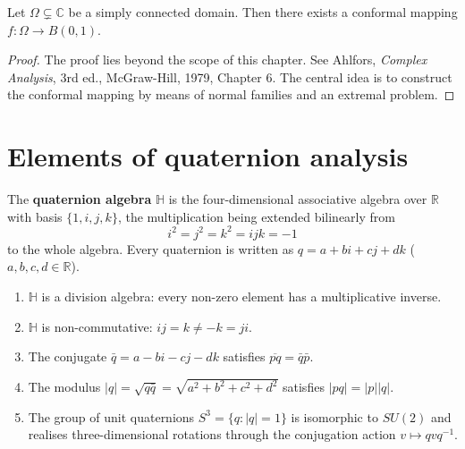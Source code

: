\begin{theorem}\label{thm:ca_riemann_mapping}
Let $\Omega \subsetneq \mathbb{C}$ be a simply connected domain. Then there exists a conformal mapping $f: \Omega \to B(0, 1)$.
\end{theorem}

\begin{proof}
The proof lies beyond the scope of this chapter. See Ahlfors, \textit{Complex Analysis}, 3rd ed., McGraw-Hill, 1979, Chapter 6. The central idea is to construct the conformal mapping by means of normal families and an extremal problem.
\end{proof}

\section{Elements of quaternion analysis}

\begin{definition}\label{def:ca_quaternion_algebra}
The \textbf{quaternion algebra} $\mathbb{H}$ is the four-dimensional associative algebra over $\mathbb{R}$ with basis $\{1, i, j, k\}$, the multiplication being extended bilinearly from
\[
i^2 = j^2 = k^2 = ijk = -1
\]
to the whole algebra. Every quaternion is written as $q = a + bi + cj + dk$ ($a, b, c, d \in \mathbb{R}$).
\end{definition}

\begin{proposition}\label{prop:ca_quaternion_props}
\begin{enumerate}[label=(\roman*)]
    \item $\mathbb{H}$ is a division algebra: every non-zero element has a multiplicative inverse.
    \item $\mathbb{H}$ is non-commutative: $ij = k \neq -k = ji$.
    \item The conjugate $\bar{q} = a - bi - cj - dk$ satisfies $\overline{pq} = \bar{q} \bar{p}$.
    \item The modulus $|q| = \sqrt{q\bar{q}} = \sqrt{a^2 + b^2 + c^2 + d^2}$ satisfies $|pq| = |p| |q|$.
    \item The group of unit quaternions $S^3 = \{q : |q| = 1\}$ is isomorphic to $SU(2)$ and realises three-dimensional rotations through the conjugation action $v \mapsto qvq^{-1}$.
\end{enumerate}
\end{proposition}

